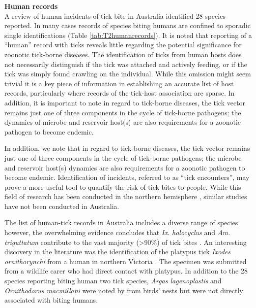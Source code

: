 \documentclass[a4paper, nobind]{templates/ociamthesis}
\begin{document}
\textbf{Human records}\\
A review of human incidents of tick bite in Australia identified 28 species reported.
In many cases records of species biting humans are confined to sporadic single identifications (Table \ref{tab:T2humanrecords}).
It is noted that reporting of a ``human'' record with ticks reveals little regarding the potential significance for zoonotic tick-borne diseases.
The identification of ticks from human hosts does not necessarily distinguish if the tick was attached and actively feeding, or if the tick was simply found crawling on the individual.
While this omission might seem trivial it is a key piece of information in establishing an accurate list of host records, particularly where records of the tick-host association are sparse.
In addition, it is important to note in regard to tick-borne diseases, the tick vector remains just one of three components in the cycle of tick-borne pathogens; the dynamics of microbe and reservoir host(s) are also requirements for a zoonotic pathogen to become endemic.

In addition, we note that in regard to tick-borne diseases, the tick vector remains just one of three components in the cycle of tick-borne pathogens; the microbe and reservoir host(s) dynamics are also requirements for a zoonotic pathogen to become endemic.
Identification of incidents, referred to as ``tick encounters'', may prove a more useful tool to quantify the risk of tick bites to people.
While this field of research has been conducted in the northern hemisphere \autocite{hookHumanTickEncounters2021}, similar studies have not been conducted in Australia.

The list of human-tick records in Australia includes a diverse range of species however, the overwhelming evidence concludes that \emph{Ix. holocyclus} and \emph{Am. triguttatum} contribute to the vast majority (\textgreater90\%) of tick bites \autocite{goftonBacterialProfilingReveals2015,geary30YearsSamples2020}.
An interesting discovery in the literature was the identification of the platypus tick \emph{Ixodes ornithorynchi} from a human in northern Victoria \autocite{geary30YearsSamples2020}. The specimen was submitted from a wildlife carer who had direct contact with platypus. In addition to the 28 species reporting biting human two tick species, \emph{Argas lagenoplastis} and \emph{Ornithodorus macmillani} were noted by \textcite{geary30YearsSamples2020} from birds' nests but were not directly associated with biting humans.
\end{document}
